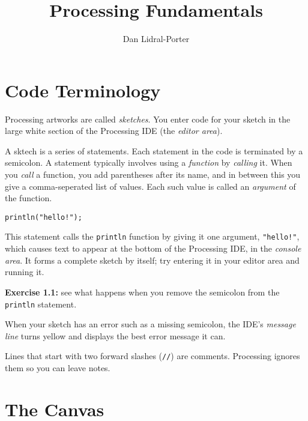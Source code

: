 \documentclass[
]{leaflet}
\title{Processing Fundamentals\vspace{-2ex}}
\author{%
  Dan Lidral-Porter\vspace{-2ex}
}
\date{}
\begin{document}


\maketitle
\thispagestyle{empty}


\section{Code Terminology}

Processing artworks are called \textit{sketches}.
You enter code for your sketch in the large white section of the Processing IDE (the \textit{editor area}).

A sktech is a series of statements.
Each statement in the code is terminated by a semicolon.
A statement typically involves using a \textit{function} by \textit{calling} it.
When you \textit{call} a function, you add parentheses after its name, and in between this you give a comma-seperated list of values.
Each such value is called an \textit{argument} of the function.

\begin{lstlisting}
println("hello!");
\end{lstlisting}
\vspace{-0.5em}
This statement calls the \texttt{println} function by giving it one argument, \texttt{"hello!"}, which causes text to appear at the bottom of the Processing IDE, in the \textit{console area}.
It forms a complete sketch by itself; try entering it in your editor area and running it.

\textbf{Exercise 1.1:} see what happens when you remove the semicolon from the \texttt{println} statement.

When your sketch has an error such as a missing semicolon, the IDE's \textit{message line} turns yellow and displays the best error message it can.

Lines that start with two forward slashes (\texttt{//}) are comments.
Processing ignores them so you can leave notes.

\vspace{-0.5em}

\section{The Canvas}
\end{document}
